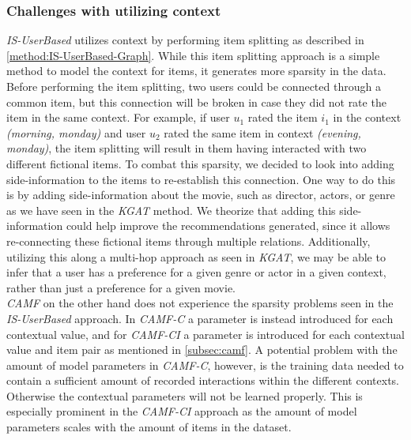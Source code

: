 \subsubsection{Challenges with utilizing context}
\textit{IS-UserBased} utilizes context by performing item splitting as described in \autoref{method:IS-UserBased-Graph}.
While this item splitting approach is a simple method to model the context for items, it generates more sparsity in the data.
Before performing the item splitting, two users could be connected through a common item, but this connection will be broken in case they did not rate the item in the same context.
For example, if user $u_1$ rated the item $i_1$ in the context \textit{(morning, monday)} and user $u_2$ rated the same item in context \textit{(evening, monday)}, the item splitting will result in them having interacted with two different fictional items.
To combat this sparsity, we decided to look into adding side-information to the items to re-establish this connection.
One way to do this is by adding side-information about the movie, such as director, actors, or genre as we have seen in the \textit{KGAT} method.
We theorize that adding this side-information could help improve the recommendations generated, since it allows re-connecting these fictional items through multiple relations.
Additionally, utilizing this along a multi-hop approach as seen in \textit{KGAT}, we may be able to infer that a user has a preference for a given genre or actor in a given context, rather than just a preference for a given movie.\\
\textit{CAMF} on the other hand does not experience the sparsity problems seen in the \textit{IS-UserBased} approach.
In \textit{CAMF-C} a parameter is instead introduced for each contextual value, and for \textit{CAMF-CI} a parameter is introduced for each contextual value and item pair as mentioned in \autoref{subsec:camf}.
A potential problem with the amount of model parameters in \textit{CAMF-C}, however, is the training data needed to contain a sufficient amount of recorded interactions within the different contexts. 
Otherwise the contextual parameters will not be learned properly.
This is especially prominent in the \textit{CAMF-CI} approach as the amount of model parameters scales with the amount of items in the dataset.

